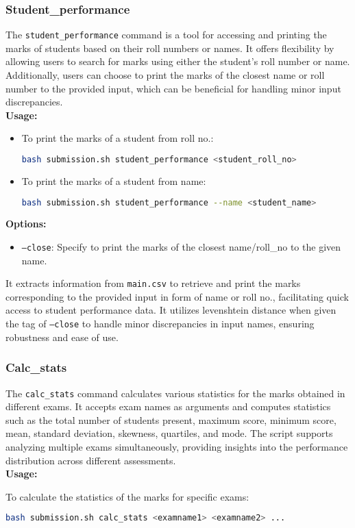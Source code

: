\documentclass{article}
\begin{document}
\subsubsection{Student\_performance}
The \texttt{student\_performance} command is a tool for accessing and printing the marks of students based on their roll numbers or names. It offers flexibility by allowing users to search for marks using either the student's roll number or name. Additionally, users can choose to print the marks of the closest name or roll number to the provided input, which can be beneficial for handling minor input discrepancies.\\
\textbf{Usage:}
\begin{itemize}
    \item To print the marks of a student from roll no.:
    \begin{lstlisting}[language=bash]
    bash submission.sh student_performance <student_roll_no>
    \end{lstlisting}
    \item To print the marks of a student from name:
    \begin{lstlisting}[language=bash]
    bash submission.sh student_performance --name <student_name>
    \end{lstlisting}
\end{itemize}

\textbf{Options:}
\begin{itemize}
    \item \texttt{--close}: Specify to print the marks of the closest name/roll\_no to the given name.
\end{itemize}

It extracts information from \texttt{main.csv} to retrieve and print the marks corresponding to the provided input in form of name or roll no., facilitating quick access to student performance data. It utilizes levenshtein distance when given the tag of \texttt{--close} to handle minor discrepancies in input names, ensuring robustness and ease of use. 

\subsubsection{Calc\_stats}
The \texttt{calc\_stats} command calculates various statistics for the marks obtained in different exams. It accepts exam names as arguments and computes statistics such as the total number of students present, maximum score, minimum score, mean, standard deviation, skewness, quartiles, and mode. The script supports analyzing multiple exams simultaneously, providing insights into the performance distribution across different assessments.\\
\textbf{Usage:}
\begin{adjustwidth}{0.5cm}{0cm}
To calculate the statistics of the marks for specific exams:
\begin{lstlisting}[language=bash]
bash submission.sh calc_stats <examname1> <examname2> ...
\end{lstlisting}
\end{adjustwidth}
\end{document}
